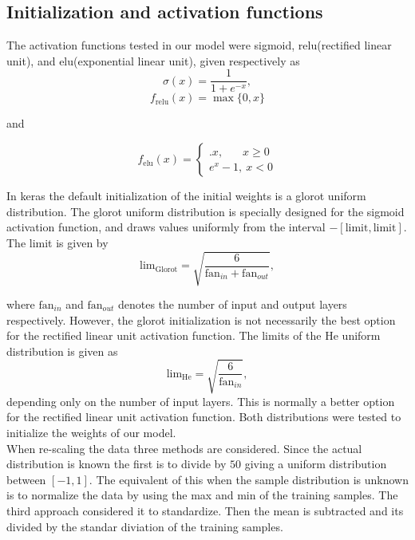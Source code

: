\documentclass[prl,twocolumn]{revtex4-1}
\begin{document}
\subsection{Initialization and activation functions}
The activation functions tested in our model were sigmoid, relu(rectified linear unit), and elu(exponential linear unit), given respectively as
\begin{equation}
    \sigma(x) = \frac{1}{1+e^{-x}},
    \label{eq:sigmoid}
\end{equation}
\begin{equation}
    f_\textrm{relu}(x) = \max \{0,x\}
    \label{eq:relu}
\end{equation}

\begin{center}
and
\end{center}
\begin{equation}
    f_\textrm{elu}(x) = \begin{cases}.
    x, \ \ \ \ \ \ \ \, x \geq 0\\
    e^x -1, \ x < 0
    \end{cases}
    \label{eq:elu}
\end{equation}

In keras the default initialization of the initial weights is a glorot uniform distribution. The glorot uniform distribution is specially designed for the sigmoid activation function, and draws values uniformly from the interval $-[\textrm{limit},\textrm{limit}]$. The limit is given by 
\begin{equation}
    \textrm{lim}_\textrm{Glorot} = \sqrt{\frac{6}{\textrm{fan}_{in}+\textrm{fan}_{out}}},
\end{equation}

where $\textrm{fan}_{in}$ and $\textrm{fan}_{out}$ denotes the number of input and output layers respectively. However, the glorot initialization is not necessarily the best option for the rectified linear unit activation function. The limits of the He uniform distribution is given as
\begin{equation}
    \textrm{lim}_\textrm{He} = \sqrt{\frac{6}{\textrm{fan}_{in}}},
\end{equation}
depending only on the number of input layers. This is normally a better option for the rectified linear unit activation function. Both distributions were tested to initialize the weights of our model.
\\
When re-scaling the data three methods are considered. Since the actual distribution is known the first is to divide by $50$ giving a uniform distribution between $[-1,1]$. The equivalent of this when the sample distribution is unknown is to normalize the data by using the max and min of the training samples. The third approach considered it to standardize. Then the mean is subtracted and its divided by the standar diviation of the training samples.  
\end{document}
